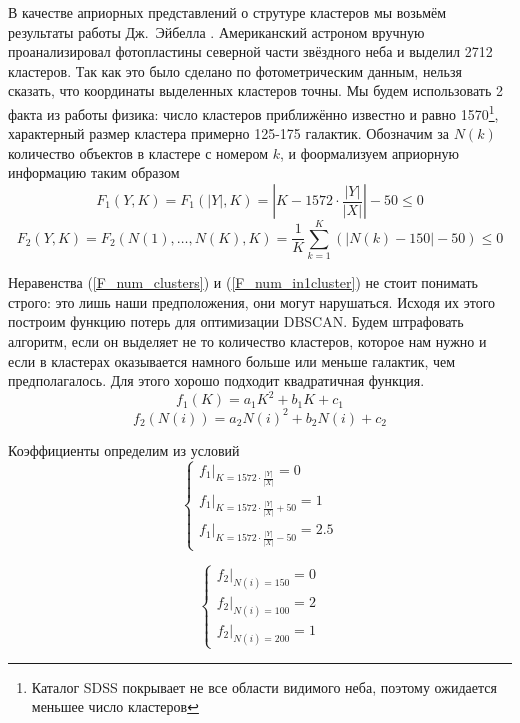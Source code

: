 \documentclass[12pt,fleqn]{article}
\begin{document}
В качестве априорных представлений о струтуре кластеров мы возьмём результаты работы Дж.~Эйбелла \cite{Abell}. Американский астроном вручную проанализировал фотопластины северной части звёздного неба и выделил 2712 кластеров. Так как это было сделано по фотометрическим данным, нельзя сказать, что координаты выделенных кластеров точны. Мы будем использовать 2 факта из работы физика: число кластеров приближённо известно и равно 1570\footnote{Каталог SDSS покрывает не все области видимого неба, поэтому ожидается меньшее число кластеров}, характерный размер кластера примерно 125-175 галактик.
Обозначим за $N(k)$ количество объектов в кластере с номером $k$, и фоормализуем априорную информацию таким образом
\begin{equation}\label{F_num_clusters}
  F_1(Y, K) = F_1(|Y|, K) = |K -  1572\cdot \frac{|Y|}{|X|}| - 50  \leq 0
\end{equation}
\begin{equation}\label{F_num_in1cluster}
  F_2(Y, K) =  F_2(N(1), \dots, N(K), K) = \frac{1}{K} \sum_{k=1}^K \left( | N(k) -150 | - 50 \right)  \leq 0
\end{equation}

Неравенства (\ref{F_num_clusters}) и (\ref{F_num_in1cluster}) не стоит понимать строго: это лишь наши предположения, они могут нарушаться. Исходя их этого построим функцию потерь для оптимизации DBSCAN. Будем штрафовать алгоритм, если он выделяет не то количество кластеров, которое нам нужно и если в кластерах оказывается намного больше или меньше галактик, чем предполагалось. Для этого хорошо подходит квадратичная функция.
$$f_1(K) = a_1K^2 + b_1K + c_1$$
$$f_2(N(i)) = a_2N(i)^2 + b_2N(i) + c_2$$

Коэффициенты определим из условий
\begin{equation}\label{system_num_cl}
 \begin{cases}
   f_1|_{K=1572 \cdot \frac{|Y|}{|X|}} = 0
   \\
   f_1|_{K=1572 \cdot \frac{|Y|}{|X|} + 50} = 1
   \\
   f_1|_{K=1572 \cdot \frac{|Y|}{|X|} - 50} = 2.5
 \end{cases}
\end{equation}

\begin{equation}\label{system_num_in1cl}
 \begin{cases}
   f_2|_{N(i)=150} = 0
   \\
   f_2|_{N(i)=100} = 2
   \\
   f_2|_{N(i)=200} = 1
 \end{cases}
\end{equation}
\end{document}
